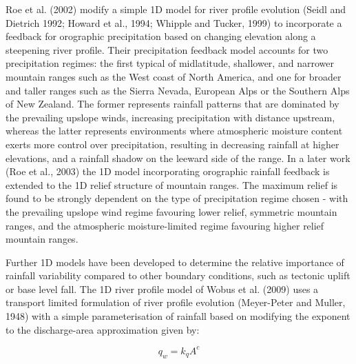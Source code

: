 \documentclass[12pt,oneside,PhD]{muthesis}
\begin{document}
Roe et al. (2002) modify a simple 1D model for river profile evolution (Seidl and Dietrich 1992; Howard et al., 1994; Whipple and Tucker, 1999) to incorporate a feedback for orographic precipitation based on changing elevation along a steepening river profile. Their precipitation feedback model accounts for two precipitation regimes: the first typical of midlatitude, shallower, and narrower mountain ranges such as the West coast of North America, and one for broader and taller ranges such as the Sierra Nevada, European Alps or the Southern Alps of New Zealand. The former represents rainfall patterns that are dominated by the prevailing upslope winds, increasing precipitation with distance upstream, whereas the latter represents environments where atmospheric moisture content exerts more control over precipitation, resulting in decreasing rainfall at higher elevations, and a rainfall shadow on the leeward side of the range. In a later work (Roe et al., 2003) the 1D model incorporating orographic rainfall feedback is extended to the 1D relief structure of mountain ranges. The maximum relief is found to be strongly dependent on the type of precipitation regime chosen - with the prevailing upslope wind regime favouring lower relief, symmetric mountain ranges, and the atmospheric moisture-limited regime favouring higher relief mountain ranges.

Further 1D models have been developed to determine the relative importance of rainfall variability compared to other boundary conditions, such as tectonic uplift or base level fall. The 1D river profile model of Wobus et al. (2009) uses a transport limited formulation of river profile evolution (Meyer-Peter and Muller, 1948) with a simple parameterisation of rainfall based on modifying the exponent to the discharge-area approximation given by:

\begin{equation}
q_w = k_qA^c
\end{equation}
\end{document}
